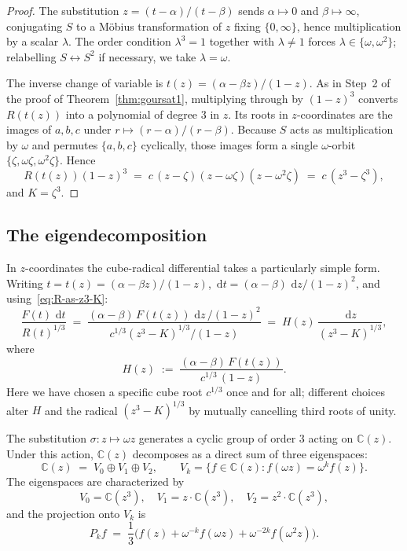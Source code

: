 \documentclass[11pt,a4paper]{article}
\theoremstyle{plain}
\theoremstyle{definition}
\theoremstyle{remark}
\newcommand{\C}{\mathbb{C}}
\renewcommand{\d}{\,\mathrm{d}}
\begin{document}
\begin{proof}
The substitution $z=(t-\alpha)/(t-\beta)$ sends $\alpha\mapsto 0$ and $\beta\mapsto\infty$, conjugating $S$ to a M\"obius transformation of $z$ fixing $\{0,\infty\}$, hence multiplication by a scalar $\lambda$. The order condition $\lambda^3=1$ together with $\lambda\neq 1$ forces $\lambda\in\{\omega,\omega^2\}$; relabelling $S\leftrightarrow S^2$ if necessary, we take $\lambda=\omega$.

The inverse change of variable is $t(z)=(\alpha-\beta z)/(1-z)$. As in Step~2 of the proof of Theorem~\ref{thm:goursat1}, multiplying through by $(1-z)^3$ converts $R(t(z))$ into a polynomial of degree $3$ in $z$. Its roots in $z$-coordinates are the images of $a,b,c$ under $r\mapsto(r-\alpha)/(r-\beta)$. Because $S$ acts as multiplication by $\omega$ and permutes $\{a,b,c\}$ cyclically, those images form a single $\omega$-orbit $\{\zeta,\omega\zeta,\omega^2\zeta\}$. Hence
\[
  R(t(z))(1-z)^3 \;=\; c\,(z-\zeta)(z-\omega\zeta)(z-\omega^2\zeta) \;=\; c\,(z^3 - \zeta^3),
\]
and $K=\zeta^3$.
\end{proof}

\subsection{The eigendecomposition}

In $z$-coordinates the cube-radical differential takes a particularly simple form. Writing $t=t(z)=(\alpha-\beta z)/(1-z)$, $\d t=(\alpha-\beta)\,\d z/(1-z)^2$, and using~\eqref{eq:R-as-z3-K}:
\begin{equation}\label{eq:H-defn}
  \frac{F(t)\,\d t}{R(t)^{1/3}} \;=\; \frac{(\alpha-\beta)\,F(t(z))\,\d z\,/(1-z)^2}{c^{1/3}(z^3-K)^{1/3}/(1-z)} \;=\; H(z)\,\frac{\d z}{(z^3-K)^{1/3}},
\end{equation}
where
\begin{equation}\label{eq:H-formula}
  H(z) \;:=\; \frac{(\alpha-\beta)\,F(t(z))}{c^{1/3}\,(1-z)}.
\end{equation}
Here we have chosen a specific cube root $c^{1/3}$ once and for all; different choices alter $H$ and the radical $(z^3-K)^{1/3}$ by mutually cancelling third roots of unity.

The substitution $\sigma\colon z\mapsto \omega z$ generates a cyclic group of order $3$ acting on $\C(z)$. Under this action, $\C(z)$ decomposes as a direct sum of three eigenspaces:
\[
  \C(z) \;=\; V_0 \oplus V_1 \oplus V_2,\qquad V_k = \{f \in \C(z) : f(\omega z) = \omega^k f(z)\}.
\]
The eigenspaces are characterized by
\[
  V_0 = \C(z^3),\quad V_1 = z\cdot\C(z^3),\quad V_2 = z^2\cdot\C(z^3),
\]
and the projection onto $V_k$ is
\begin{equation}\label{eq:projection-Vk}
  P_k f \;=\; \frac{1}{3}\bigl(f(z) + \omega^{-k}f(\omega z) + \omega^{-2k}f(\omega^2 z)\bigr).
\end{equation}
\end{document}
